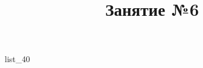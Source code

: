 \documentclass[12pt, a4paper]{article}
\begin{document}
	\title{Занятие №6}
	{list_40}
\end{document}
